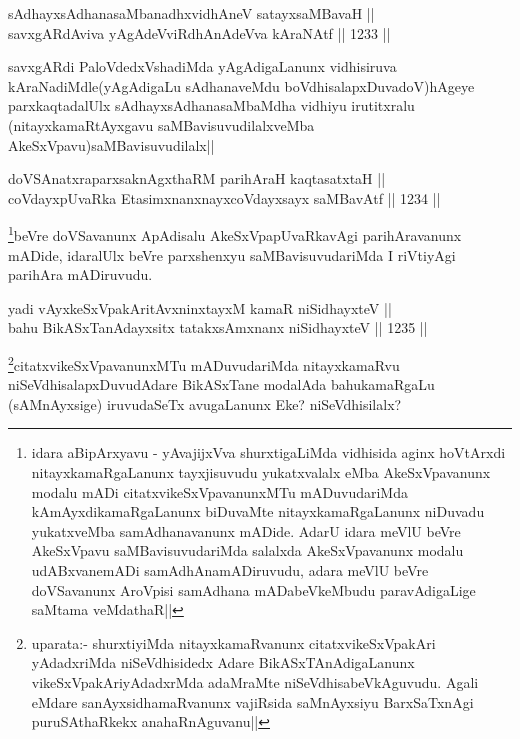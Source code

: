 
\begin{shl}
sAdhayxsAdhanasaMbanadhxvidhAneV satayxsaMBavaH ||  \\
savxgARdAviva yAgAdeVviRdhAnAdeVva kAraNAtf ||  1233 ||  
\end{shl}

\begin{artha}
savxgARdi PaloVdedxVshadiMda yAgAdigaLanunx vidhisiruva kAraNadiMdle(yAgAdigaLu sAdhanaveMdu boVdhisalapxDuvadoV)hAgeye parxkaqtadalUlx sAdhayxsAdhanasaMbaMdha vidhiyu irutitxralu (nitayxkamaRtAyxgavu saMBavisuvudilalxveMba AkeSxVpavu)saMBavisuvudilalx||
\end{artha}


\begin{shl}
doVSAnatxraparxsaknAgxthaRM parihAraH kaqtasatxtaH || \\
coVdayxpUvaRka EtasimxnanxnayxcoVdayxsayx saMBavAtf ||  1234 ||   
\end{shl}

\begin{artha}
\footnote{idara aBipArxyavu - yAvajijxVva shurxtigaLiMda vidhisida aginx hoVtArxdi nitayxkamaRgaLanunx tayxjisuvudu yukatxvalalx eMba AkeSxVpavanunx modalu mADi citatxvikeSxVpavanunxMTu mADuvudariMda kAmAyxdikamaRgaLanunx biDuvaMte nitayxkamaRgaLanunx niDuvadu yukatxveMba samAdhanavanunx mADide. AdarU idara meVlU beVre AkeSxVpavu saMBavisuvudariMda salalxda AkeSxVpavanunx modalu udABxvanemADi samAdhAnamADiruvudu, adara meVlU beVre doVSavanunx AroVpisi samAdhana mADabeVkeMbudu  paravAdigaLige saMtama veMdathaR||}beVre doVSavanunx ApAdisalu AkeSxVpapUvaRkavAgi parihAravanunx mADide, idaralUlx beVre parxshenxyu saMBavisuvudariMda I riVtiyAgi parihAra mADiruvudu.
\end{artha}


\begin{shl}
yadi vAyxkeSxVpakAritAvxninxtayxM kamaR niSidhayxteV || \\
bahu BikASxTanAdayxsitx tatakxsAmxnanx niSidhayxteV ||  1235 ||  
\end{shl}

\begin{artha}
\footnote{uparata:- shurxtiyiMda nitayxkamaRvanunx citatxvikeSxVpakAri yAdadxriMda niSeVdhisidedx Adare BikASxTAnAdigaLanunx vikeSxVpakAriyAdadxrMda  adaMraMte niSeVdhisabeVkAguvudu. Agali eMdare sanAyxsidhamaRvanunx vajiRsida saMnAyxsiyu BarxSaTxnAgi puruSAthaRkekx anahaRnAguvanu||}citatxvikeSxVpavanunxMTu mADuvudariMda nitayxkamaRvu niSeVdhisalapxDuvudAdare BikASxTane modalAda bahukamaRgaLu (sAMnAyxsige) iruvudaSeTx avugaLanunx Eke? niSeVdhisilalx?
\end{artha}

